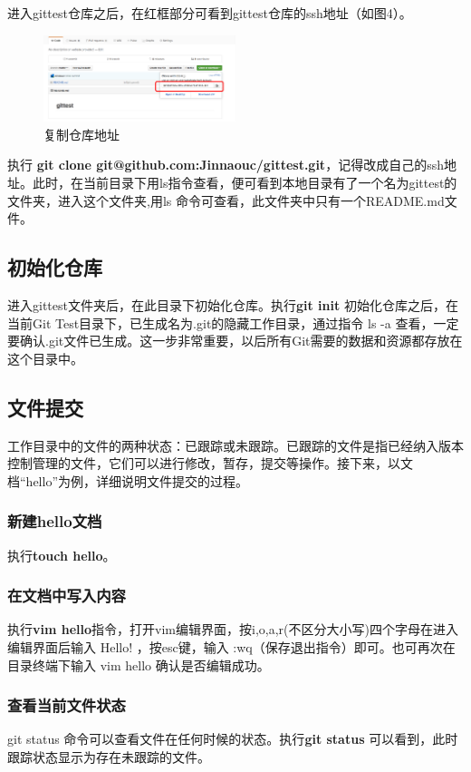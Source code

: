 \documentclass{article}
\begin{document}
进入gittest仓库之后，在红框部分可看到gittest仓库的ssh地址（如图4）。

\begin{figure}[!htb] %
\centering \includegraphics[width=0.5\textwidth]{fig4.png} \caption{复制仓库地址}
\label{fig:1}
\end{figure}

执行 \textbf{git clone git@github.com:Jinnaouc/gittest.git}，记得改成自己的ssh地址。此时，在当前目录下用ls指令查看，便可看到本地目录有了一个名为gittest的文件夹，进入这个文件夹,用ls 命令可查看，此文件夹中只有一个README.md文件。

\subsection{初始化仓库}
进入gittest文件夹后，在此目录下初始化仓库。执行\textbf{git init} 初始化仓库之后，在当前Git Test目录下，已生成名为.git的隐藏工作目录，通过指令 ls -a 查看，一定要确认.git文件已生成。这一步非常重要，以后所有Git需要的数据和资源都存放在这个目录中。

\subsection{文件提交}
工作目录中的文件的两种状态：已跟踪或未跟踪。已跟踪的文件是指已经纳入版本控制管理的文件，它们可以进行修改，暂存，提交等操作。接下来，以文档“hello”为例，详细说明文件提交的过程。
\subsubsection{新建hello文档}
执行\textbf{touch hello}。
\subsubsection{在文档中写入内容}
执行\textbf{vim hello}指令，打开vim编辑界面，按i,o,a,r(不区分大小写)四个字母在进入编辑界面后输入 Hello! ，按esc键，输入 :wq（保存退出指令）即可。也可再次在目录终端下输入 vim hello 确认是否编辑成功。
\subsubsection{查看当前文件状态}
git status 命令可以查看文件在任何时候的状态。执行\textbf{git status} 可以看到，此时跟踪状态显示为存在未跟踪的文件。
\end{document}
